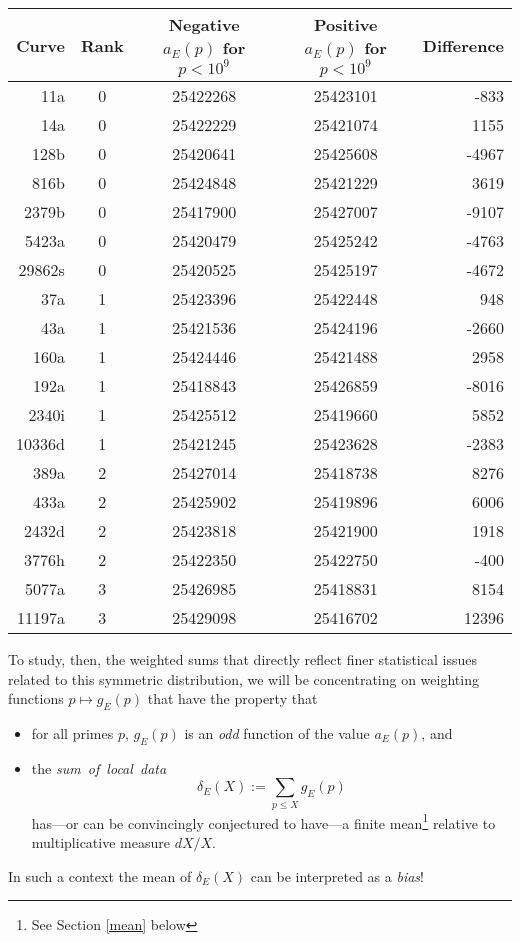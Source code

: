 \documentclass[11pt]{article}
\theoremstyle{plain}
\theoremstyle{definition}
\numberwithin{equation}{section}
\numberwithin{figure}{section}
\numberwithin{table}{section}
\begin{document}
\begin{itemize}
\begin{center}
\begin{tabular} {r | c | c | c | r}\hline
Curve & Rank & Negative $a_E(p)$ for $p<10^9$ & Positive $a_E(p)$ for $p<10^9$ & Difference\\ \hline\hline
11a    & 0      & 25422268       & 25423101     &   -833 \\ \hline
14a    & 0      & 25422229       & 25421074     &   1155 \\ \hline
128b   & 0      & 25420641       & 25425608     &   -4967 \\ \hline
816b   & 0      & 25424848       & 25421229     &   3619 \\ \hline
2379b  & 0      & 25417900       & 25427007     &   -9107 \\ \hline
5423a  & 0      & 25420479       & 25425242     &   -4763 \\ \hline
29862s & 0      & 25420525       & 25425197     &   -4672 \\ \hline
37a    & 1      & 25423396       & 25422448     &   948 \\ \hline
43a    & 1      & 25421536       & 25424196     &   -2660 \\ \hline
160a   & 1      & 25424446       & 25421488     &   2958 \\ \hline
192a   & 1      & 25418843       & 25426859     &   -8016 \\ \hline
2340i  & 1      & 25425512       & 25419660     &   5852 \\ \hline
10336d & 1      & 25421245       & 25423628     &   -2383 \\ \hline
389a   & 2      & 25427014       & 25418738     &   8276 \\ \hline
433a   & 2      & 25425902       & 25419896     &   6006 \\ \hline
2432d  & 2      & 25423818       & 25421900     &   1918 \\ \hline
3776h  & 2      & 25422350       & 25422750     &   -400 \\ \hline
5077a  & 3      & 25426985       & 25418831     &   8154 \\ \hline
11197a & 3      & 25429098       & 25416702     &   12396 \\ \hline
\end{tabular}
\end{center}

\vskip20pt
  To study, then, the weighted sums that directly reflect finer statistical issues related to this symmetric distribution, we will be concentrating on weighting functions $p \mapsto g_E(p)$ that have the property that \begin{itemize} \item for all primes $p$, $g_E(p)$ is an {\it odd} function of the value  $a_E(p)$, and \item the {\it sum\ of\ local\ data}  $$\delta_E(X):=\sum_{p\le X}g_E(p)$$ has---or can be convincingly conjectured to have---a finite mean{\footnote{ See Section {\ref{mean}} below}} relative to multiplicative measure $dX/X$.\end{itemize}  In such a context  the mean of $\delta_E(X)$ can be interpreted as a {\it bias}!



\end{itemize}
\end{document}
